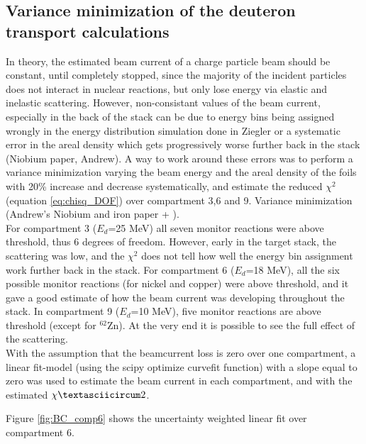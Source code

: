 \documentclass[a4paper,11pt,twoside]{book}
\begin{document}
\subsection{Variance minimization of the deuteron transport calculations}
In theory, the estimated beam current of a charge particle beam should be constant, until completely stopped, since the majority of the incident particles does not interact in nuclear reactions, but only lose energy via elastic and inelastic scattering. However, non-consistant values of the beam current, especially in the back of the stack can be due to energy bins being assigned wrongly in the energy distribution simulation done in Ziegler or a systematic error in the areal density which gets progressively worse further back in the stack (Niobium paper, Andrew). A way to work around these errors was to perform a variance minimization varying the beam energy and the areal density of the foils with 20\% increase and decrease systematically, and estimate the reduced $\chi^2$ (equation \ref{eq:chisq_DOF}) over compartment 3,6 and 9. Variance minimization (Andrew's Niobium and iron paper + ). \\

 For compartment 3 ($E_d$=25 MeV) all seven monitor reactions were above threshold,  thus 6 degrees of freedom.  However,  early in the target stack,  the scattering was low, and the $\chi^2$ does not tell how well the energy bin assignment work further back in the stack.  For compartment 6 ($E_d$=18 MeV), all the six possible monitor reactions (for nickel and copper) were above threshold, and it gave a good estimate of how the beam current was developing throughout the stack.  In compartment 9 ($E_d$=10 MeV), five monitor reactions are above threshold (except for $^{62}$Zn).  At the very end it is possible to see the full effect of the scattering.\\

With the assumption that the beamcurrent loss is zero over one compartment, a linear fit-model (using the scipy optimize curvefit function) with a slope equal to zero was used to estimate the beam current in each compartment, and with the estimated $\chiˆ2$.  

Figure \ref{fig:BC_comp6} shows the uncertainty weighted linear fit over compartment 6. 
\end{document}
